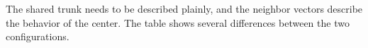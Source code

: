 The shared trunk needs to be described plainly, and the neighbor vectors describe
the behavior of the center. The table shows several differences between the two
configurations.
